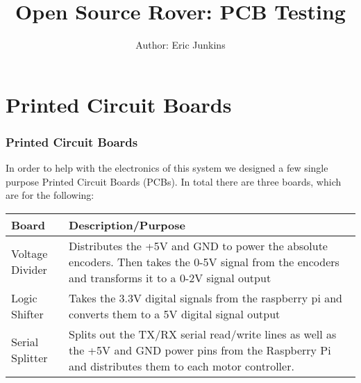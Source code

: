 \documentclass[12pt]{article}
\begin{document}
\title{Open Source Rover: PCB Testing}
\author{Author: Eric Junkins}

\makeatletter         
\def\@maketitle{
\begin{center}	
	\makebox[\textwidth][c]{ \texttt{[image: "Pictures/pcb title".png]}}
	{\Huge \bfseries \sffamily \@title }\\[3ex] 
	{\Large \sffamily \@author}\\[3ex] 
	\texttt{[image: "Pictures/Electronics/JPL logo".png]}
\end{center}}
\makeatother

\maketitle



\newpage


\tableofcontents

\newpage




\section{Printed Circuit Boards}

\subsubsection{Printed Circuit Boards}
In order to help with the electronics of this system we designed a few single purpose Printed Circuit Boards (PCBs). In total there are three boards, which are for the following:
\bigskip

\begin{tabular}[2]{| p{5cm} | p{10cm} | }
	\hline
	\textbf{Board} & \textbf{Description/Purpose} \\ \hline
	Voltage Divider & Distributes the +5V and GND to power the absolute encoders. Then takes the 0-5V signal from the encoders and transforms it to a 0-2V signal output \\ \hline
	Logic Shifter & Takes the 3.3V digital signals from the raspberry pi and converts them to a 5V digital signal output \\ \hline
	Serial Splitter & Splits out the TX/RX serial read/write lines as well as the +5V and GND power pins from the Raspberry Pi and distributes them to each motor controller. \\ \hline
\end{tabular}
\bigskip
\end{document}
